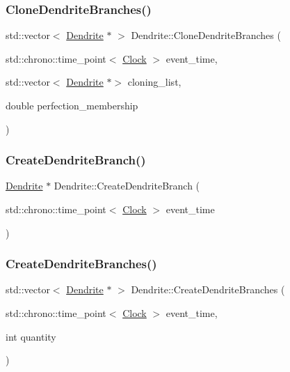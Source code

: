 \subsubsection{\texorpdfstring{Clone\+Dendrite\+Branches()}{CloneDendriteBranches()}}
{\footnotesize\ttfamily std\+::vector$<$ \mbox{\hyperlink{classDendrite}{Dendrite}} $\ast$ $>$ Dendrite\+::\+Clone\+Dendrite\+Branches (\begin{DoxyParamCaption}\item[{std\+::chrono\+::time\+\_\+point$<$ \mbox{\hyperlink{universe_8h_a0ef8d951d1ca5ab3cfaf7ab4c7a6fd80}{Clock}} $>$}]{event\+\_\+time,  }\item[{std\+::vector$<$ \mbox{\hyperlink{classDendrite}{Dendrite}} $\ast$$>$}]{cloning\+\_\+list,  }\item[{double}]{perfection\+\_\+membership }\end{DoxyParamCaption})}

\mbox{\label{classDendrite_ac7b30397a4753f9c37e96ed716e275eb}} 
\subsubsection{\texorpdfstring{Create\+Dendrite\+Branch()}{CreateDendriteBranch()}}
{\footnotesize\ttfamily \mbox{\hyperlink{classDendrite}{Dendrite}} $\ast$ Dendrite\+::\+Create\+Dendrite\+Branch (\begin{DoxyParamCaption}\item[{std\+::chrono\+::time\+\_\+point$<$ \mbox{\hyperlink{universe_8h_a0ef8d951d1ca5ab3cfaf7ab4c7a6fd80}{Clock}} $>$}]{event\+\_\+time }\end{DoxyParamCaption})}

\mbox{\label{classDendrite_a812b9cd99ae7d81023bfa25c8f563e96}} 
\subsubsection{\texorpdfstring{Create\+Dendrite\+Branches()}{CreateDendriteBranches()}}
{\footnotesize\ttfamily std\+::vector$<$ \mbox{\hyperlink{classDendrite}{Dendrite}} $\ast$ $>$ Dendrite\+::\+Create\+Dendrite\+Branches (\begin{DoxyParamCaption}\item[{std\+::chrono\+::time\+\_\+point$<$ \mbox{\hyperlink{universe_8h_a0ef8d951d1ca5ab3cfaf7ab4c7a6fd80}{Clock}} $>$}]{event\+\_\+time,  }\item[{int}]{quantity }\end{DoxyParamCaption})}

